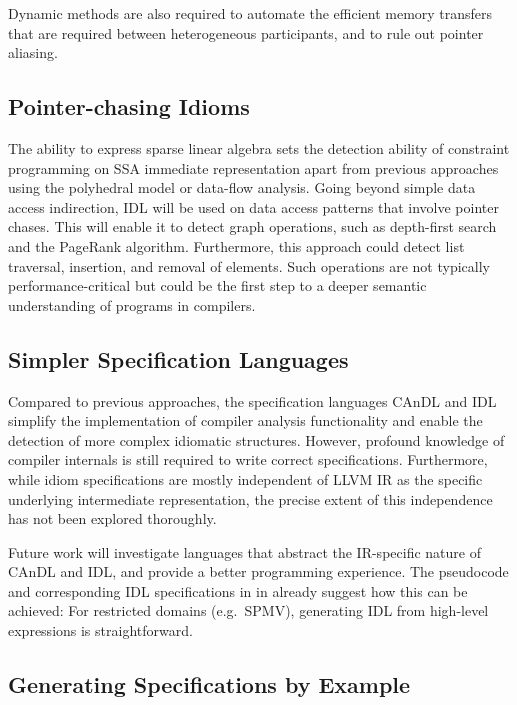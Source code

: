     Dynamic methods are also required to automate the efficient memory transfers
    that are required between heterogeneous participants, and to rule out
    pointer aliasing.

\subsection*{Pointer-chasing Idioms}

    The ability to express sparse linear algebra sets the detection ability of
    constraint programming on SSA immediate representation apart from previous
    approaches using the polyhedral model or data-flow analysis.
    Going beyond simple data access indirection, IDL will be used on data access
    patterns that involve pointer chases.
    This will enable it to detect graph operations, such as depth-first search
    and the PageRank algorithm.
    Furthermore, this approach could detect list traversal, insertion, and
    removal of elements.
    Such operations are not typically performance-critical but could be the
    first step to a deeper semantic understanding of programs in compilers.

\subsection*{Simpler Specification Languages}

    Compared to previous approaches, the specification languages CAnDL and IDL
    simplify the implementation of compiler analysis functionality and enable
    the detection of more complex idiomatic structures.
    However, profound knowledge of compiler internals is still required to
    write correct specifications.
    Furthermore, while idiom specifications are mostly independent of
    LLVM IR as the specific underlying intermediate representation, the precise
    extent of this independence has not been explored thoroughly.

    Future work will investigate languages that abstract the IR-specific nature
    of CAnDL and IDL, and provide a better programming experience.
    The pseudocode and corresponding IDL specifications in
     in  already
    suggest how this can be achieved:
    For restricted domains (e.g.\ SPMV), generating IDL from high-level
    expressions is straightforward.

\subsection*{Generating Specifications by Example}

